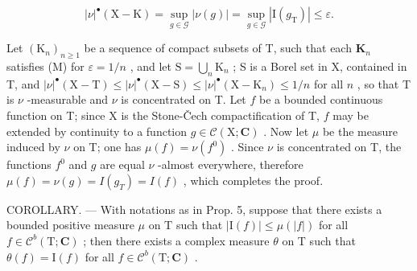 \[
| \nu | ^ {\bullet} (\mathrm{X} - \mathrm{K}) = \sup _ {g \in \mathcal {G}} | \nu (g) | = \sup _ {g \in \mathcal {G}} | \mathrm{I} (g _ {\mathrm{T}}) | \leqslant \varepsilon .
\]

Let \((\mathrm{K}_n)_{n\geqslant 1}\) be a sequence of compact subsets of T, such that each \(\mathbf{K}_n\) satisfies (M) for \(\varepsilon = 1 / n\) , and let \(\mathrm{S} = \bigcup_{n}\mathrm{K}_{n}\) ; S is a Borel set in X, contained in T, and \(|\nu|^{\bullet}(\mathrm{X} - \mathrm{T})\leqslant |\nu |^{\bullet}(\mathrm{X} - \mathrm{S})\leqslant |\nu |^{\bullet}(\mathrm{X} - \mathrm{K}_n)\leqslant 1 / n\) for all \(n\) , so that T is \(\nu\) -measurable and \(\nu\) is concentrated on T. Let \(f\) be a bounded continuous function on T; since X is the Stone-Čech compactification of T, \(f\) may be extended by continuity to a function \(g\in \mathcal{C}(\mathrm{X};\mathbf{C})\) . Now let \(\mu\) be the measure induced by \(\nu\) on T; one has \(\mu(f) = \nu(f^0)\) . Since \(\nu\) is concentrated on T, the functions \(f^0\) and \(g\) are equal \(\nu\) -almost everywhere, therefore \(\mu(f) = \nu(g) = I(g_T) = I(f)\) , which completes the proof.

COROLLARY. --- With notations as in Prop. 5, suppose that there exists a bounded positive measure \(\mu\) on T such that \(|\mathrm{I}(f)| \leqslant \mu(|f|)\) for all \(f \in \mathcal{C}^b(\mathrm{T};\mathbf{C})\) ; then there exists a complex measure \(\theta\) on T such that \(\theta(f) = \mathrm{I}(f)\) for all \(f \in \mathcal{C}^b(\mathrm{T};\mathbf{C})\) .

